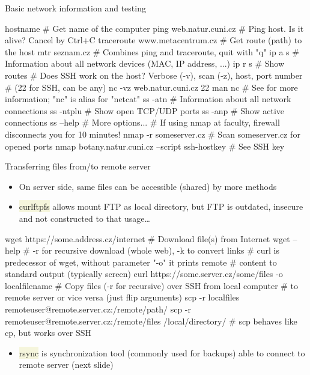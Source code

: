 \documentclass[compress, xelatex, 11pt, xcolor=svgnames, aspectratio=169, url={hyphens, lowtilde}]{beamer}
\renewcommand{\texttt}[1]{\colorbox{Beige}{{\ttfamily #1}}}
\begin{document}
\begin{frame}[fragile]{Basic network information and testing}
	\begin{bashcode}
    hostname # Get name of the computer
    ping web.natur.cuni.cz # Ping host. Is it alive? Cancel by Ctrl+C
    traceroute www.metacentrum.cz # Get route (path) to the host
    mtr seznam.cz # Combines ping and traceroute, quit with "q"
    ip a s # Information about all network devices (MAC, IP address, ...)
    ip r s # Show routes
    # Does SSH work on the host? Verbose (-v), scan (-z), host, port number
    # (22 for SSH, can be any)
    nc -vz web.natur.cuni.cz 22
    man nc # See for more information; "nc" is alias for "netcat"
    ss -atn # Information about all network connections
    ss -ntplu # Show open TCP/UDP ports
    ss -anp # Show active connections
    ss --help # More options...
    # If using nmap at faculty, firewall disconnects you for 10 minutes!
    nmap -r someserver.cz # Scan someserver.cz for opened ports
    nmap botany.natur.cuni.cz --script ssh-hostkey # See SSH key
	\end{bashcode}
\end{frame}

\begin{frame}[fragile]{Transferring files from/to remote server}
	\label{transfers}
	\begin{itemize}
		\item On server side, same files can be accessible (shared) by more methods
		\item \texttt{curlftpfs} allows mount FTP as local directory, but FTP is outdated, insecure and not constructed to that usage\ldots
	\end{itemize}
	\vfill
	\begin{bashcode}
    wget https://some.address.cz/internet # Download file(s) from Internet
    wget --help # -r for recursive download (whole web), -k to convert links
    # curl is predecessor of wget, without parameter "-o" it prints remote
    # content to standard output (typically screen)
    curl https://some.server.cz/some/files -o localfilename
    # Copy files (-r for recursive) over SSH from local computer
    # to remote server or vice versa (just flip arguments)
    scp -r localfiles remoteuser@remote.server.cz:/remote/path/
    scp -r remoteuser@remote.server.cz:/remote/files /local/directory/
    # scp behaves like cp, but works over SSH
	\end{bashcode}
	\vfill
	\begin{itemize}
		\item \texttt{rsync} is synchronization tool (commonly used for backups) able to connect to remote server (next slide)
	\end{itemize}
\end{frame}
\end{document}
